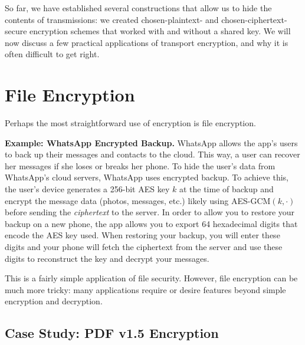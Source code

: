 \documentclass[
  letterpaper,
]{scrbook}
\theoremstyle{definition}
\theoremstyle{plain}
\theoremstyle{plain}
\theoremstyle{remark}
\begin{document}
So far, we have established several constructions that allow us to hide
the contents of transmissions: we created chosen-plaintext- and
chosen-ciphertext-secure encryption schemes that worked with and without
a shared key. We will now discuss a few practical applications of
transport encryption, and why it is often difficult to get right.

\section{File Encryption}\label{file-encryption}

Perhaps the most straightforward use of encryption is file encryption.

\textbf{Example: WhatsApp Encrypted Backup.} WhatsApp allows the app's
users to back up their messages and contacts to the cloud. This way, a
user can recover her messages if she loses or breaks her phone. To hide
the user's data from WhatsApp's cloud servers, WhatsApp uses encrypted
backup. To achieve this, the user's device generates a 256-bit AES key
\(k\) at the time of backup and encrypt the message data (photos,
messages, etc.) likely using AES-GCM\((k, \cdot)\) before sending the
\emph{ciphertext} to the server. In order to allow you to restore your
backup on a new phone, the app allows you to export 64 hexadecimal
digits that encode the AES key used. When restoring your backup, you
will enter these digits and your phone will fetch the ciphertext from
the server and use these digits to reconstruct the key and decrypt your
messages.


This is a fairly simple application of file security. However, file
encryption can be much more tricky: many applications require or desire
features beyond simple encryption and decryption.

\subsection{Case Study: PDF v1.5
Encryption}\label{case-study-pdf-v1.5-encryption}
\end{document}
